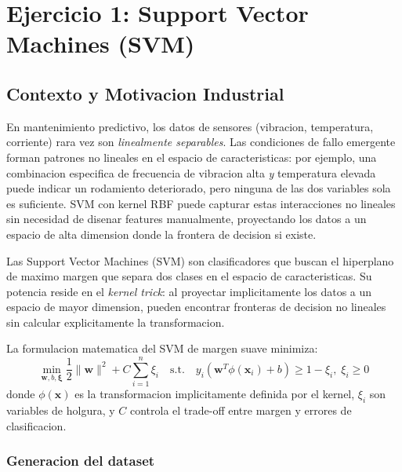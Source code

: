 \documentclass[12pt,a4paper]{article}
\begin{document}
\section{Ejercicio 1: Support Vector Machines (SVM)}

\subsection{Contexto y Motivacion Industrial}

\begin{tcolorbox}[porquebox, title={Por que SVM para mantenimiento predictivo?}]
En mantenimiento predictivo, los datos de sensores (vibracion, temperatura, corriente) rara vez
son \textit{linealmente separables}. Las condiciones de fallo emergente forman patrones no
lineales en el espacio de caracteristicas: por ejemplo, una combinacion especifica de frecuencia
de vibracion alta \textit{y} temperatura elevada puede indicar un rodamiento deteriorado, pero
ninguna de las dos variables sola es suficiente. SVM con kernel RBF puede capturar estas
interacciones no lineales sin necesidad de disenar features manualmente, proyectando los datos a
un espacio de alta dimension donde la frontera de decision si existe.
\end{tcolorbox}

Las Support Vector Machines (SVM) son clasificadores que buscan el hiperplano de maximo margen
que separa dos clases en el espacio de caracteristicas. Su potencia reside en el \textit{kernel
trick}: al proyectar implicitamente los datos a un espacio de mayor dimension, pueden encontrar
fronteras de decision no lineales sin calcular explicitamente la transformacion.

La formulacion matematica del SVM de margen suave minimiza:
\begin{equation}
  \min_{\mathbf{w}, b, \boldsymbol{\xi}} \frac{1}{2}\|\mathbf{w}\|^2 + C\sum_{i=1}^{n}\xi_i
  \quad \text{s.t.} \quad y_i(\mathbf{w}^T\phi(\mathbf{x}_i) + b) \geq 1 - \xi_i,\; \xi_i \geq 0
  \label{eq:svm_primal}
\end{equation}
donde $\phi(\mathbf{x})$ es la transformacion implicitamente definida por el kernel, $\xi_i$ son
variables de holgura, y $C$ controla el trade-off entre margen y errores de clasificacion.

\subsubsection*{Generacion del dataset}
\end{document}
